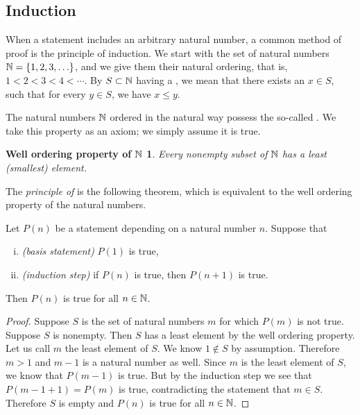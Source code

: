 \subsection{Induction}

When a statement includes an arbitrary natural number,
a common method of proof is the principle of induction.  
We start with the set of natural numbers ${\mathbb{N}} = \{ 1,2,3,\ldots \}$, and we
give them their natural ordering, 
that is, $1 < 2 < 3 < 4 < \cdots$.
By $S \subset {\mathbb{N}}$ having a \emph{}, we mean that
there exists an $x \in S$,
such that for every
$y \in S$, we have $x \leq y$.


The natural numbers ${\mathbb{N}}$ ordered in the natural way
possess the so-called \emph{}.
We take this property
as an axiom; we simply assume it is true.

\theoremstyle{plain}
\newtheorem*{wellordprop}{Well ordering property of ${\mathbb{N}}$}
\hypertarget{wop:link}{}%
\begin{wellordprop}
Every nonempty subset of ${\mathbb{N}}$ has a least (smallest) element.
\end{wellordprop}

The \emph{principle of } is
the following theorem, which is equivalent to the well ordering property of
the natural numbers.

\begin{thm} \label{induction:thm}
Let $P(n)$ be a statement depending on a natural number $n$.  Suppose that
\begin{enumerate}[(i)]
\item \emph{(basis statement)} $P(1)$ is true,
\item \emph{(induction step)} if $P(n)$ is true, then $P(n+1)$ is true.
\end{enumerate}
Then $P(n)$ is true for all $n \in {\mathbb{N}}$.
\end{thm}

\begin{proof}
Suppose $S$ is the set of natural numbers $m$ for which $P(m)$ is
not true.  Suppose
$S$ is nonempty.  Then $S$ has a least element by the well ordering
property.  Let us call $m$ the least element of $S$.  We know $1 \notin
S$ by assumption.  Therefore $m > 1$ and $m-1$ is a natural number as well.
Since $m$ is the least element of $S$, we know that $P(m-1)$ is true.
But by the induction step we see that $P(m-1+1) = P(m)$ is true, 
contradicting the statement that $m \in S$.  Therefore $S$ is empty and 
$P(n)$ is true for all $n \in {\mathbb{N}}$.
\end{proof}

